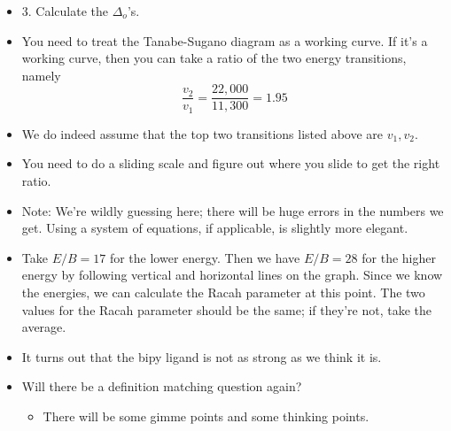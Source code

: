 \documentclass[../notes.tex]{subfiles}
\begin{document}
\begin{itemize}
\begin{itemize}
    \end{itemize}
    \item 3. Calculate the $\Delta_o$'s.
    \item You need to treat the Tanabe-Sugano diagram as a working curve. If it's a working curve, then you can take a ratio of the two energy transitions, namely
    \begin{equation*}
        \frac{v_2}{v_1} = \frac{22,000}{11,300}
        = 1.95
    \end{equation*}
    \item We do indeed assume that the top two transitions listed above are $v_1,v_2$.
    \item You need to do a sliding scale and figure out where you slide to get the right ratio.
    \item Note: We're wildly guessing here; there will be huge errors in the numbers we get. Using a system of equations, if applicable, is slightly more elegant.
    \item Take $E/B=17$ for the lower energy. Then we have $E/B=28$ for the higher energy by following vertical and horizontal lines on the graph. Since we know the energies, we can calculate the Racah parameter at this point. The two values for the Racah parameter should be the same; if they're not, take the average.
    \item It turns out that the bipy ligand is not as strong as we think it is.
    \item Will there be a definition matching question again?
    \begin{itemize}
        \item There will be some gimme points and some thinking points.
    \end{itemize}
\end{itemize}
\end{document}
